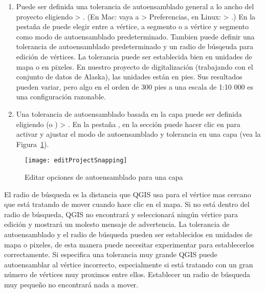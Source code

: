 \begin{enumerate}
\item Puede ser definida una tolerancia de autoensamblado general a lo ancho del proyecto eligiendo
 > . 
(En Mac: vaya a   > Preferencias, en Linux:  > .)
En la pesta\~na de  puede elegir entre a v\'ertice, a segmento o  a v\'ertice y
segmento como modo de autoensamblado predeterminado. Tambien puede definir una tolerancia de
autoensamblado predeterminado y un radio de b\'usqeuda para edici\'on de v\'ertices. La tolerancia puede ser establecida bien
en unidades de mapa o en pixeles.
En nuestro proyecto de digitalizaci\'on (trabajando con el conjunto de datos de Alaska),
las unidades est\'an en pies. Sus resultados pueden variar, pero algo en el
orden de 300 pies a una escala de 1:10 000 es una configuraci\'on razonable.
\item Una tolerancia de autoensamblado basada en la capa puede ser definida eligiendo
 (o ) > . En la pesta\~na , en la secci\'on  puede hacer clic
en  para activar y ajustar el modo de autoensamblado
y tolerancia en una capa (vea la Figura~\ref{fig:snappingoptions}).
\end{enumerate}

\begin{figure}[H]
   \begin{center}
   \caption{Editar opciones de autoensamblado para una capa \nixcaption}\label{fig:snappingoptions}\smallskip
   \texttt{[image: editProjectSnapping]} 
\end{center}  
\end{figure}


El radio de b\'usqueda es la distancia que QGIS usa para  el v\'ertice
mas cercano que est\'a tratando de mover cuando hace clic en el
mapa. Si no est\'a dentro del radio de b\'usqueda, QGIS no encontrar\'a y seleccionar\'a
ning\'un v\'ertice para edici\'on y mostrar\'a un molesto mensaje de advertencia.
La tolerancia de autoensamblado y el radio de b\'usqueda pueden ser establecidos en unidades de mapa o pixeles, de esta manera puede
necesitar experimentar para establecerlos correctamente. Si especifica una tolerancia muy grande
QGIS puede autoensamblar al v\'ertice incorrecto, especialmente si est\'a tratando
con un gran n\'umero de v\'ertices muy proximos entre ellos. Establecer un radio de b\'usqueda muy
peque\~no no encontrar\'a nada a mover.

